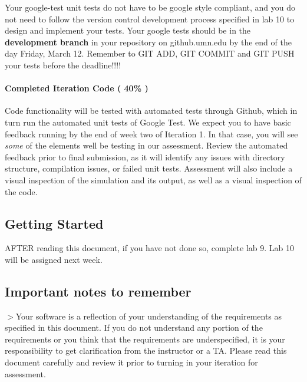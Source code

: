 Your google-\/test unit tests do not have to be google style compliant, and you do not need to follow the version control development process specified in lab 10 to design and implement your tests. Your google tests should be in the {\bfseries development branch} in your repository on github.\+umn.\+edu by the end of the day Friday, March 12. Remember to G\+IT A\+DD, G\+IT C\+O\+M\+M\+IT and G\+IT P\+U\+SH your tests before the deadline!!!!

\paragraph*{Completed Iteration Code ( 40\% )}

Code functionality will be tested with automated tests through Github, which in turn run the automated unit tests of Google Test. We expect you to have basic feedback running by the end of week two of Iteration 1. In that case, you will see {\itshape some} of the elements we\textquotesingle{}ll be testing in our assessment. Review the automated feedback prior to final submission, as it will identify any issues with directory structure, compilation issues, or failed unit tests. Assessment will also include a visual inspection of the simulation and its output, as well as a visual inspection of the code.





\subsection*{Getting Started}

A\+F\+T\+ER reading this document, if you have not done so, complete lab 9. Lab 10 will be assigned next week.





\subsection*{Important notes to remember}

$>$Your software is a reflection of your understanding of the requirements as specified in this document. If you do not understand any portion of the requirements or you think that the requirements are underspecified, it is your responsibility to get clarification from the instructor or a TA. Please read this document carefully and review it prior to turning in your iteration for assessment.


